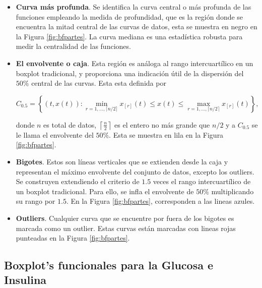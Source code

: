 \begin{itemize}
    \item \textbf{Curva más profunda}. Se identifica la curva central o más profunda de las funciones empleando la medida de profundidad, que es la región donde se encuentra la mitad central de las curvas de datos, esta se muestra en negro en la Figura \ref{fig:bfpartes}. La curva mediana es una estadística robusta para medir la centralidad de las funciones.

    \item \textbf{El envolvente o caja}. Esta región es análoga al rango intercuartílico en un boxplot tradicional, y proporciona una indicación útil de la dispersión del $50\%$ central de las curvas. Esta esta definida por

    \begin{equation}
        C_{0.5} = \left\{(t, x(t)): \min _{r=1, \ldots,\lceil n / 2\rceil} x_{[r]}(t) \leq x(t) \leq \max _{r=1, \ldots,\lceil n / 2\rceil} x_{[r]}(t)\right\},
    \end{equation}

    donde $n$ es total de datos, $ \left \lceil \frac{n}{2}\right \rceil$ es el entero no más grande que $n/2$ y a $C_{0.5}$ se le llama el envolvente del $50 \%$. Esta se muestra en lila en la Figura \ref{fig:bfpartes}.
    
    \item \textbf{Bigotes}. Estos son líneas verticales que se extienden desde la caja y representan el máximo envolvente del conjunto de datos, excepto los outliers. Se construyen extendiendo el criterio de $1.5$ veces el rango intercuartílico de un boxplot tradicional. Para ello, se infla el envolvente de $50\%$ multiplicando su rango por $1.5$. En la Figura \ref{fig:bfpartes}, corresponden a las lineas azules.

    \item \textbf{Outliers}. Cualquier curva que se encuentre por fuera de los bigotes es marcada como un outlier. Estas curvas están marcadas con lineas rojas punteadas en la Figura \ref{fig:bfpartes}.
\end{itemize}

\subsection{Boxplot's funcionales para la Glucosa e Insulina}

